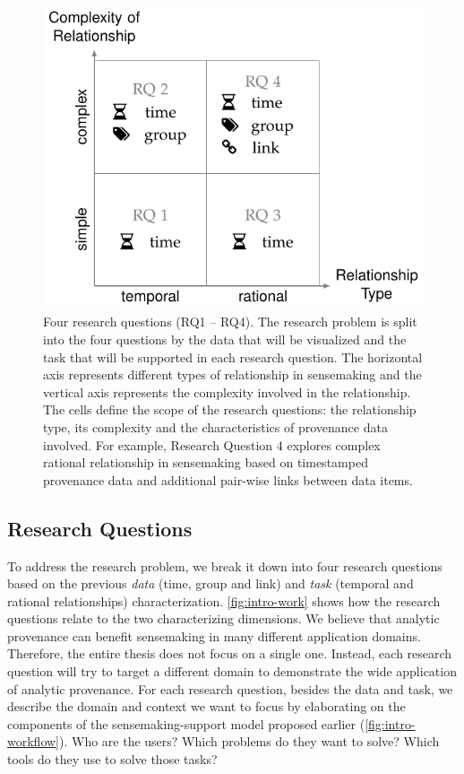 \begin{figure}[!htb]
	\centering
	\includegraphics{work}
	\caption{Four research questions (RQ1 -- RQ4). The research problem is split into the four questions by the data that will be visualized and the task that will be supported in each research question. The horizontal axis represents different types of relationship in sensemaking and the vertical axis represents the complexity involved in the relationship. The cells define the scope of the research questions: the relationship type, its complexity and the characteristics of provenance data involved. For example, Research Question 4 explores complex rational relationship in sensemaking based on timestamped provenance data and additional pair-wise links between data items.}
	\label{fig:intro-work}
\end{figure}

\subsection{Research Questions}
\label{intro:questions}
To address the research problem, we break it down into four research questions based on the previous \emph{data} (time, group and link) and \emph{task} (temporal and rational relationships) characterization. \autoref{fig:intro-work} shows how the research questions relate to the two characterizing dimensions. We believe that analytic provenance can benefit sensemaking in many different application domains. Therefore, the entire thesis does not focus on a single one. Instead, each research question will try to target a different domain to demonstrate the wide application of analytic provenance. For each research question, besides the data and task, we describe the domain and context we want to focus by elaborating on the components of the sensemaking-support model proposed earlier (\autoref{fig:intro-workflow}). Who are the users? Which problems do they want to solve? Which tools do they use to solve those tasks?

